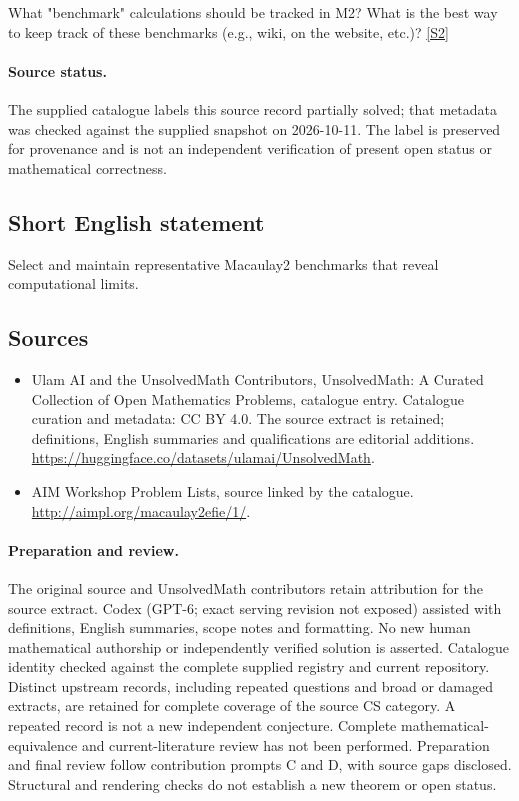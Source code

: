 \documentclass[11pt]{article}
\newcommand{\sref}[2]{\hyperlink{source:#1:#2}{[S#2]}}
\begin{document}
What "benchmark" calculations should be tracked in M2? What is the best way to keep track of these benchmarks (e.g., wiki, on the website, etc.)? \sref{statement}{2}
\paragraph{Source status.}
The supplied catalogue labels this source record partially solved; that metadata was checked against the supplied snapshot on 2026-10-11. The label is preserved for provenance and is not an independent verification of present open status or mathematical correctness.
\subsection{Short English statement}
Select and maintain representative Macaulay2 benchmarks that reveal computational limits.
\subsection{Sources}
\begin{itemize}
\item[\hypertarget{source:statement:1}{S1}] Ulam AI and the UnsolvedMath Contributors, UnsolvedMath: A Curated Collection of Open Mathematics Problems, catalogue entry. Catalogue curation and metadata: CC BY 4.0. The source extract is retained; definitions, English summaries and qualifications are editorial additions.
\url{https://huggingface.co/datasets/ulamai/UnsolvedMath}.
\item[\hypertarget{source:statement:2}{S2}] AIM Workshop Problem Lists, source linked by the catalogue.
\url{http://aimpl.org/macaulay2efie/1/}.
\end{itemize}
\paragraph{Preparation and review.}
The original source and UnsolvedMath contributors retain attribution for the source extract. Codex (GPT-6; exact serving revision not exposed) assisted with definitions, English summaries, scope notes and formatting. No new human mathematical authorship or independently verified solution is asserted. Catalogue identity checked against the complete supplied registry and current repository. Distinct upstream records, including repeated questions and broad or damaged extracts, are retained for complete coverage of the source CS category. A repeated record is not a new independent conjecture. Complete mathematical-equivalence and current-literature review has not been performed. Preparation and final review follow contribution prompts C and D, with source gaps disclosed. Structural and rendering checks do not establish a new theorem or open status.
\label{end:statement}
\end{document}
